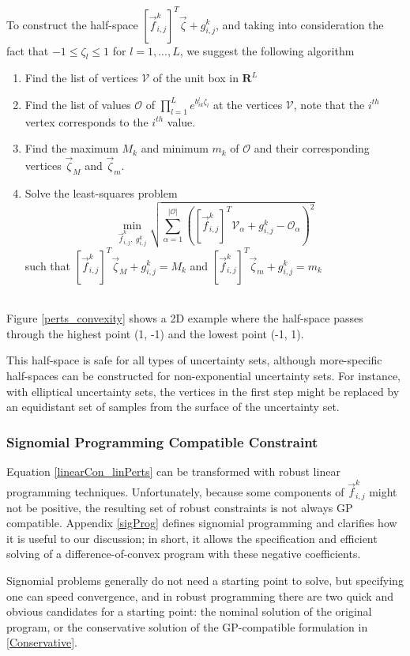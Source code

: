 To construct the half-space $[\vec{f}_{i,j}^k]^T\vec{\zeta} + g_{i,j}^k$, and taking into consideration the fact that $-1 \leq \zeta_l \leq 1$ for $l = 1,...,L$, we suggest the following algorithm
\\
\begin{enumerate}
	\item Find the list of vertices $\mathcal{V}$ of the unit box in $\mathbf{R}^L$
	\item Find the list of values $\mathcal{O}$ of $\textstyle{\prod}_{l=1}^{L}e^{b^l_{ik}\zeta_l}$ at the vertices $\mathcal{V}$, note that the $i^{th}$ vertex corresponds to the $i^{th}$ value.
	\item Find the maximum $M_k$ and minimum $m_k$ of $\mathcal{O}$ and their corresponding vertices $\vec{\zeta}_M$ and $\vec{\zeta}_m$.
	\item Solve the least-squares problem 
	$$\min_{\vec{f}_{i,j}^k,\ g_{i,j}^k} \sqrt{\textstyle{\sum}_{\alpha=1}^{|\mathcal{O}|}([\vec{f}_{i,j}^k]^T\mathcal{V}_{\alpha} + g_{i,j}^k - \mathcal{O}_{\alpha})^2}$$
	such that $[\vec{f}_{i,j}^k]^T\vec{\zeta}_M + g_{i,j}^k = M_k$ and $[\vec{f}_{i,j}^k]^T\vec{\zeta}_m + g_{i,j}^k = m_k$
\end{enumerate}
\ \\
Figure \ref{perts_convexity} shows a 2D example where the half-space passes through the highest point (1, -1) and the lowest point (-1, 1).

This half-space is safe for all types of uncertainty sets, although more-specific half-spaces can be constructed for non-exponential uncertainty sets. For instance, with elliptical uncertainty sets, the vertices in the first step might be replaced by an equidistant set of samples from the surface of the uncertainty set.

\subsubsection{Signomial Programming Compatible Constraint}
Equation \eqref{linearCon_linPerts} can be transformed with robust linear programming techniques. Unfortunately, because some components of $\vec{f}_{i,j}^k$ might not be positive, the resulting set of robust constraints is not always GP compatible. Appendix \ref{sigProg} defines signomial programming and clarifies how it is useful to our discussion; in short, it allows the specification and efficient solving of a difference-of-convex program with these negative coefficients.

Signomial problems generally do not need a starting point to solve, but specifying one can speed convergence, and in robust programming there are two quick and obvious candidates for a starting point: the nominal solution of the original program, or the conservative solution of the GP-compatible formulation in \ref{Conservative}.

